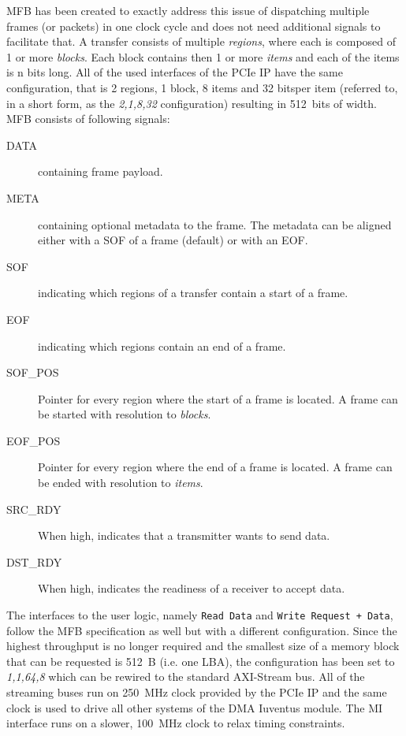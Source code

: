 \ac{MFB} has been created to exactly address this issue of dispatching multiple frames (or packets)
in one clock cycle and does not need additional signals to facilitate that. A transfer consists of
multiple \emph{regions}, where each is composed of 1 or more \emph{blocks}. Each block contains then
1 or more \emph{items} and each of the items is n bits long. All of the used interfaces of the PCIe
IP have the same configuration, that is 2 regions, 1 block, 8 items and 32 bits\footnotemark\@ per
item (referred to, in a short form, as the \emph{2,1,8,32} configuration) resulting in 512~bits of
width. MFB consists of following signals:


\begin{description}
    \item[DATA] containing frame payload.
    \item[META] containing optional metadata to the frame. The metadata can be aligned either with
    a SOF of a frame (default) or with an EOF.
    \item[SOF] indicating which regions of a transfer contain a start of a frame.
    \item[EOF] indicating which regions contain an end of a frame.
    \item[SOF\_POS] Pointer for every region where the start of a frame is located. A frame can be
    started with resolution to \emph{blocks}.
    \item[EOF\_POS] Pointer for every region where the end of a frame is located. A frame can be
    ended with resolution to \emph{items}.
    \item[SRC\_RDY] When high, indicates that a transmitter wants to send data.
    \item[DST\_RDY] When high, indicates the readiness of a receiver to accept data.
\end{description}

The interfaces to the user logic, namely \verb|Read Data| and \verb|Write Request + Data|, follow
the \ac{MFB} specification as well but with a different configuration. Since the highest throughput is
no longer required and the smallest size of a memory block that can be requested is 512~B (i.e. one
\ac{LBA}), the configuration has been set to \emph{1,1,64,8} which can be rewired to the standard
AXI-Stream bus. All of the streaming buses run on 250~MHz clock provided by the PCIe IP and the same
clock is used to drive all other systems of the DMA Iuventus module. The \ac{MI} interface runs on a
slower, 100~MHz clock to relax timing constraints.

